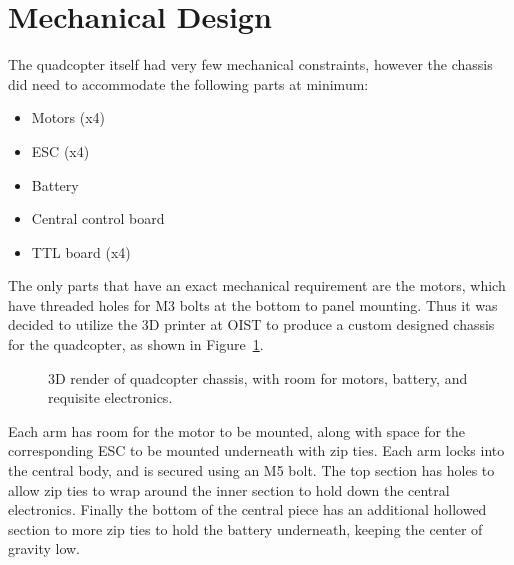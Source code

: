 \documentclass[11pt]{article} %
\begin{document}
\section{Mechanical Design}
The quadcopter itself had very few mechanical constraints, however the chassis did need to accommodate the following parts at minimum:
\begin{itemize}
\item Motors (x4)
\item ESC (x4)
\item Battery
\item Central control board
\item TTL board (x4)
\end{itemize}
The only parts that have an exact mechanical requirement are the motors, which have threaded holes for M3 bolts at the bottom to panel mounting. Thus it was decided to utilize the 3D printer at OIST to produce a custom designed chassis for the quadcopter, as shown in Figure~\ref{fig:chassis}.
\begin{figure}[h]
	\caption{3D render of quadcopter chassis, with room for motors, battery, and requisite electronics.}
	\label{fig:chassis}
\end{figure}
Each arm has room for the motor to be mounted, along with space for the corresponding ESC to be mounted underneath with zip ties. Each arm locks into the central body, and is secured using an M5 bolt. The top section has holes to allow zip ties to wrap around the inner section to hold down the central electronics. Finally the bottom of the central piece has an additional hollowed section to more zip ties to hold the battery underneath, keeping the center of gravity low.
\end{document}
